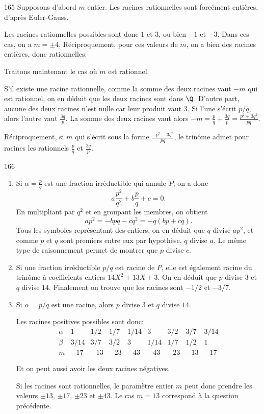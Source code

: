 \begin{Soln}{165}
Supposons d'abord $m$ entier. Les racines rationnelles sont forcément entières, d'après Euler-Gauss.

Les racines rationnelles possibles sont donc $1$ et $3$, ou bien $-1$ et $-3$. Dans ces cas, on a $m=\pm 4$. Réciproquement, pour ces valeurs de $m$, on a bien des racines entières, donc rationnelles.

Traitons maintenant le cas où $m$ est rationnel.

S'il existe une racine rationnelle, comme la somme des deux racines vaut $-m$ qui est rationnel, on en déduit que les deux racines sont dans $\Q$. D'autre part, aucune des deux racines n'est nulle car leur produit vaut $3$. Si l'une s'écrit $p/q$, alors l'autre vaut $\frac{3q}{p}$. La somme des deux racines vaut alors $-m=\frac{p}{q} + \frac{3q}{p} = \frac{p^2+3q^2}{pq}$.

Réciproquement, si $m$ qui s'écrit sous la forme $\frac{-p^2-3q^2}{pq}$, le trinôme admet pour racines les rationnels $\frac{p}{q}$ et $\frac{3q}{p}$.
\end{Soln}
\begin{Soln}{166}
\begin{enumerate}
\item
Si $\alpha=\frac{p}{q}$ est une fraction irréductible qui annule $P$, on a donc
\[ a\frac{p^2}{q^2}+b\frac{p}{q}+c=0. \]
En multipliant par $q^2$ et en groupant les membres, on obtient
\[ ap^2=-bpq-cq^2=-q(bp+cq).\]
Tous les symboles représentant des entiers, on en déduit que  $q$ divise $ap^2$, et comme $p$ et $q$ sont premiers entre eux par hypothèse, $q$ divise $a$. Le même type de raisonnement permet de montrer que $p$ divise $c$.
\item Si une fraction irréductible $p/q$ est racine de $P$, elle est également racine du trinôme à coefficients entiers $14X^2+13X+3$. On en déduit que $p$ divise $3$ et $q$ divise $14$.
Finalement on trouve que les racines sont $-1/2$ et $-3/7$.
\item Si $\alpha = p/q$ est une racine, alors $p$ divise $3$ et $q$ divise $14$.

Les racines positives possibles sont donc:
\[
\begin{array}{ccccccccc}
\alpha  & 1& 1/2 & 1/7 & 1/14 & 3 & 3/2 & 3/7 & 3/14 \\
\beta  & 3/14 & 3/7 & 3/2 & 3 & 1/14 & 1/7 & 1/2 & 1\\
m & -17 & -13 & -23 & -43 & -43 & -23 & -13 & -17
\end{array}
\]

Et on peut aussi avoir les deux racines négatives.


Si les racines sont rationnelles, le paramètre entier $m$ peut donc prendre les valeurs $\pm 13$, $\pm 17$, $\pm 23$ et $\pm 43$. Le cas $m=13$ correspond à la question précédente.

\end{enumerate}
\end{Soln}
